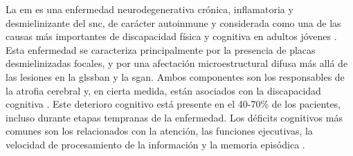 
La \gls{em} es una enfermedad neurodegenerativa crónica, inflamatoria y desmielinizante del \gls{snc}, de carácter autoinmune y considerada como una de las causas más importantes de discapacidad física y cognitiva en adultos jóvenes \cite{Rocca2015ClinicalSclerosis}. Esta enfermedad se caracteriza principalmente por la presencia de placas desmielinizadas focales, y por una afectación microestructural difusa más allá de las lesiones en la gls{sban} y la \gls{sgan}. Ambos componentes son los responsables de la atrofia cerebral y, en cierta medida, están asociados con la discapacidad cognitiva \cite{Kutzelnigg2014PathologyDiseases}. Este deterioro cognitivo está presente en el 40-70\% de los pacientes, incluso durante etapas tempranas de la enfermedad. Los déficits cognitivos más comunes son los relacionados con la atención, las funciones ejecutivas, la velocidad de procesamiento de la información y la memoria episódica \cite{Chiaravalloti2008CognitiveSclerosisb}. 

